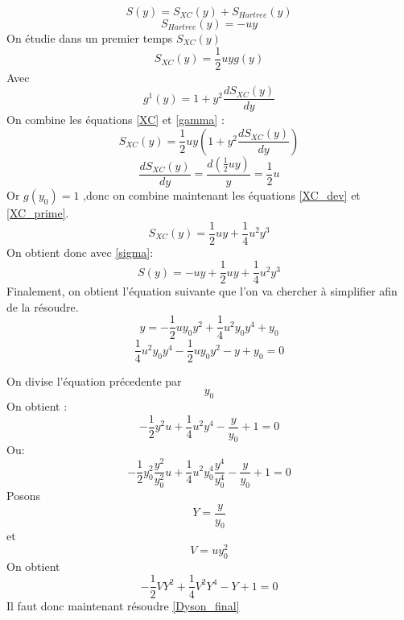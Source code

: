 \documentclass[12pt]{article}
\begin{document}
\begin{equation}
\label{sigma}
	S(y) = S_{XC}(y) + S_{Hartree}(y)
\end{equation}
\begin{equation}
\label{Hartree} 
	S_{Hartree}(y) = -uy
\end{equation}
On \'etudie dans un premier temps $S_{XC}(y)$ 
\begin{equation}
\label{XC} 
	S_{XC}(y) = \frac{1}{2} u y g(y)
\end{equation}
Avec
\begin{equation} 
\label{gamma} 
	g^1(y) = 1 + y^2 \frac{dS_{XC}(y)}{dy} 
\end{equation}
On combine les \'equations \ref{XC} et \ref{gamma} : 
\begin{equation} 
\label{XC_dev}
	S_{XC}(y) = \frac{1}{2} u y (1 + y^2 \frac{dS_{XC}(y)}{dy})
\end{equation}
\begin{equation} 
\label{XC_prime} 
	\frac{dS_{XC}(y)}{dy} = \frac{d(\frac{1}{2} u y )}{y} = \frac{1}{2} u 
\end{equation}
Or $g(y_0) = 1$ ,donc on combine maintenant les \'equations \ref{XC_dev}  et \ref{XC_prime}.
\begin{equation}
\label{XC_final} 
	S_{XC}(y) = \frac{1}{2} u y + \frac{1}{4} u^2 y^3 
\end{equation}
On obtient donc avec \ref{sigma}: 
\begin{equation}
\label{Sigma_final} 
	S(y) = -uy +  \frac{1}{2} u y + \frac{1}{4} u^2 y^3 
\end{equation}
Finalement, on obtient l'\'equation suivante que l'on va chercher \`a simplifier afin de la r\'esoudre.
\begin{equation}
	y = -\frac{1}{2} u y_0 y^2 + \frac{1}{4} u^2 y_0 y^4 + y_0
\end{equation}
\begin{equation}
	\frac{1}{4} u^2 y_0 y^4 -\frac{1}{2} u y_0 y^2 - y + y_0 = 0
\end{equation}

On divise l'\'equation pr\'ecedente par $$ {y_0}$$
On obtient : 
\begin{equation}
	 -\frac{1}{2} y^2 u + \frac{1}{4} u^2 y^4 -\frac{y}{y_0}+1 = 0
\end{equation}
Ou:
\begin{equation}
    -\frac{1}{2} y_0^2 \frac{y^2}{y_0^2} u+ \frac{1}{4} u^2 y_0^4 \frac{y^4}{y_0^4} - \frac{y}{y_0} + 1 = 0
\end{equation}
Posons $$ Y = \frac{y}{y_0}$$ et  $$V=u y_0^2$$
On obtient
\begin{equation}
\label{Dyson_final} 
     -\frac{1}{2} V Y^2 +\frac{1}{4} V^2 Y^4 -Y +1 = 0
\end{equation}
Il faut donc maintenant r\'esoudre \ref{Dyson_final}
%
\end{document}
